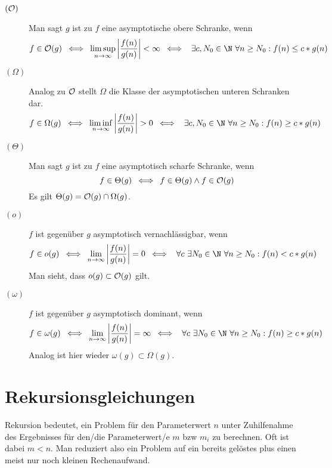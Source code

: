 \begin{description}
	\item[$(\mathcal O)$] Man sagt $g$ ist zu $f$ eine asymptotische obere Schranke, wenn
	\begin{equation*}
		f\in\O(g)\enspace\Longleftrightarrow\enspace \limsup_{n\to\infty} \left|\frac{f(n)}{g(n)}\right|<\infty\enspace\Longleftrightarrow\enspace \ \exists c,N_0\in\N\ \forall n\geq N_0:f(n)\leq c*g(n)
	\end{equation*}

	\item[$(\Omega)$] Analog zu $\mathcal O$ stellt $\Omega$ die Klasse der asymptotischen unteren Schranken dar.
	\begin{equation*}
		f\in\Omega(g) \enspace\Longleftrightarrow\enspace \liminf_{n\to\infty} \left|\frac{f(n)}{g(n)}\right|>0\enspace\Longleftrightarrow\enspace \ \exists c,N_0\in\N\ \forall n\geq N_0:f(n)\geq c*g(n)
	\end{equation*}


	\item[$(\Theta)$] Man sagt $g$ ist zu $f$ eine asymptotisch scharfe Schranke, wenn
	\begin{equation*}
		f\in\Theta(g)\enspace\Longleftrightarrow\enspace f\in\Theta(g)\wedge f\in\mathcal O(g)
	\end{equation*}
	Es gilt $\Theta(g)=\mathcal O(g)\cap \Omega(g)$.


	\item[$(o)$] $f$ ist gegenüber $g$ asymptotisch vernachlässigbar, wenn
	\begin{equation*}
		f\in o(g)\enspace\Longleftrightarrow\enspace \lim_{n\to\infty} \left|\frac{f(n)}{g(n)}\right|=0\enspace\Longleftrightarrow\enspace \ \forall c\ \exists N_0\in\N\ \forall n\geq N_0:f(n)< c*g(n)
	\end{equation*}
	Man sieht, dass $o(g)\subset \mathcal O(g)$ gilt.


	\item[$(\omega)$] $f$ ist gegenüber $g$ asymptotisch dominant, wenn
	\begin{equation*}
		f\in\omega(g) \enspace\Longleftrightarrow\enspace \lim_{n\to\infty} \left|\frac{f(n)}{g(n)}\right|=\infty\enspace\Longleftrightarrow\enspace \ \forall c\ \exists N_0\in\N\ \forall n\geq N_0:f(n)\geq c*g(n)
	\end{equation*}
	Analog ist hier wieder $\omega(g)\subset \Omega(g)$.
\end{description}


\section{Rekursionsgleichungen}
Rekursion bedeutet, ein Problem für den Parameterwert $n$ unter Zuhilfenahme des Ergebnisses für den/die Parameterwert/e $m$ bzw $m_i$ zu berechnen.
Oft ist dabei $m<n$. Man reduziert also ein Problem auf ein bereits gelöstes plus einen meist nur noch kleinen Rechenaufwand.

